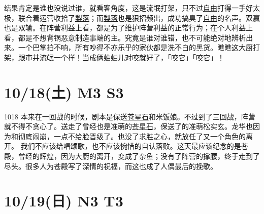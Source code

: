 结果肯定是谁也没说过谁，就看客角度，这是流氓打架，只不过\uline{自由}打得一手好太极，联合着运营收拾了\uline{梨落}；而\uline{梨落}也是狠招频出，成功搞臭了\uline{自由}的名声。双赢也是双输。在阵营利益上看，都是为了维护阵营利益的正常行为；在个人利益上看，都是不想背锅恶意制造事端的主。究竟是谁对谁错，也不可能绝对地辨析出来。一个巴掌拍不响，所有吵得不亦乐乎的家伙都是洗不白的黑货。瞧瞧这大厨打架，跟市井流氓一个样！当成俩蛐蛐儿对咬就好了，「咬它」「咬它」！

\section{10/18(土) M3 S3}


1018 本来在一回战的时候，剧本是保送\uline{苍星石}和米饭娘。不过到了三回战，阵营就不得不贪心了。送走了曾经也是准萌的\uline{苍星石}，保送了的准萌松实玄。龙华也因为和彻底闹崩，一点不给脸晋级了。也没了求胜之心，就放任了又一个角色的离开。
我们不应该给唱颂歌，也不应该惋惜的自认落败。这天最应该纪念的是苍殿，曾经的辉煌，因为大厨的离开，变成了杂鱼；没有了阵营的撑腰，终于走到了尽头。很多人为苍殿写了深情的祝福，而这也成了人偶最后的挽歌。

\section{10/19(日) N3 T3}


